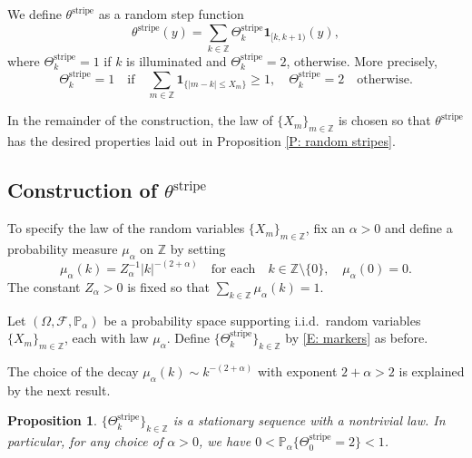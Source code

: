 \documentclass[10pt,a4paper]{amsart}
\newtheorem{prop}{Proposition}
\begin{document}
We define $\theta^{\text{stripe}}$ as a random step function
	\begin{equation} \label{E: random step correlations}
		\theta^{\text{stripe}}(y) = \sum_{k \in \mathbb{Z}} \Theta^{\text{stripe}}_{k} \mathbf{1}_{[k,k+1)}(y),
	\end{equation}
where $\Theta^{\text{stripe}}_{k} = 1$ if $k$ is illuminated and $\Theta^{\text{stripe}}_{k} = 2$, otherwise.  More precisely,
	\begin{equation} \label{E: markers}
		\Theta^{\text{stripe}}_{k} = 1 \quad \text{if} \quad \sum_{m \in \mathbb{Z}} \mathbf{1}_{\{|m - k| \leq X_{m}\}} \geq 1 , \quad \Theta^{\text{stripe}}_{k} = 2 \quad \text{otherwise.}	
	\end{equation}

In the remainder of the construction, the law of $\{X_{m}\}_{m \in \mathbb{Z}}$ is chosen so that $\theta^{\text{stripe}}$ has the desired properties laid out in Proposition \ref{P: random stripes}.
	
\subsection{Construction of $\theta^{\text{stripe}}$} \label{S: algebraic correlation construction} To specify the law of the random variables $\{X_{m}\}_{m \in \mathbb{Z}}$, fix an $\alpha > 0$ and define a probability measure $\mu_{\alpha}$ on $\mathbb{Z}$ by setting
	\begin{equation*}
		\mu_{\alpha}(k) = Z_{\alpha}^{-1} |k|^{-(2 + \alpha)} \quad \text{for each} \quad k \in \mathbb{Z} \setminus \{0\}, \quad \mu_{\alpha}(0) = 0.
	\end{equation*}
The constant $Z_{\alpha} > 0$ is fixed so that $\sum_{k \in \mathbb{Z}} \mu_{\alpha}(k) = 1$.

Let $(\Omega,\mathcal{F},\mathbb{P}_{\alpha})$ be a probability space supporting i.i.d.\ random variables $\{X_{m}\}_{m \in \mathbb{Z}}$, each with law $\mu_{\alpha}$.  Define $\{\Theta^{\text{stripe}}_{k}\}_{k \in \mathbb{Z}}$ by \eqref{E: markers} as before.  

	The choice of the decay $\mu_{ \alpha } (k) \sim k^{-(2 + \alpha)}$ with exponent $2 + \alpha > 2$ is explained by the next result.

	\begin{prop} $\{\Theta^{\text{stripe}}_{k}\}_{k \in \mathbb{Z}}$ is a stationary sequence with a nontrivial law.  In particular, for any choice of $\alpha > 0$, we have $0 < \mathbb{P}_{\alpha} \{\Theta^{\text{stripe}}_{0} = 2\} < 1$. \end{prop}
	
\end{document}
